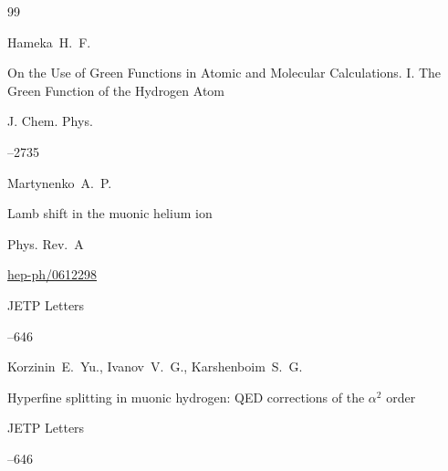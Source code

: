 \begin{thebibliography}{99}

\by Hameka~H.~F.

\paper On the Use of Green Functions in Atomic and Molecular Calculations. I. The Green Function of the Hydrogen Atom

\jour J. Chem. Phys.




--2735





\by Martynenko~A.~P.

\paper Lamb shift in the muonic helium ion

\jour Phys. Rev.~A






\arxiv \href{http://arxiv.org/abs/hep-ph/0612298}{hep-ph/0612298}




\jour JETP Letters




--646



\by Korzinin~E.~Yu., Ivanov~V.~G., Karshenboim~S.~G.

\paper Hyperfine splitting in muonic hydrogen: QED corrections of the $\alpha^2$ order

\jour JETP Letters




--646



\end{thebibliography}
